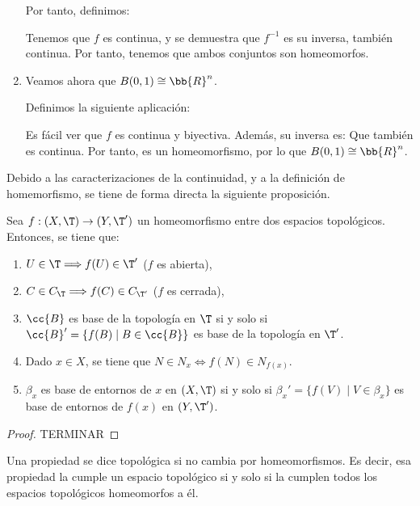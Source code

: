\begin{ejemplo}
\begin{enumerate}
        Por tanto, definimos:

        Tenemos que $f$ es continua, y se demuestra que $f^{-1}$ es su inversa, también continua. Por tanto, tenemos que ambos conjuntos son homeomorfos.

        \item Veamos ahora que $B(0,1)\cong \bb{R}^n$.

        Definimos la siguiente aplicación:

        Es fácil ver que $f$ es continua y biyectiva. Además, su inversa es: 
        Que también es continua. Por tanto, es un homeomorfismo, por lo que $B(0,1)\cong \bb{R}^n$.
    \end{enumerate}
\end{ejemplo}

Debido a las caracterizaciones de la continuidad, y a la definición de homemorfismo, se tiene de forma directa la siguiente proposición.
\begin{prop}
    Sea $f:(X,\T)\to (Y,\T')$ un homeomorfismo entre dos espacios topológicos. Entonces, se tiene que:
    \begin{enumerate}
        \item $U\in \T\Longrightarrow f(U)\in \T'$ \quad ($f$ es abierta),
        \item $C\in C_\T\Longrightarrow f(C)\in C_{\T'}$ \quad ($f$ es cerrada),
        \item $\cc{B}$ es base de la topología en $\T$ si y solo si $\cc{B}'=\{f(B)\mid B\in \cc{B}\}$ es base de la topología en $\T'$.
        \item Dado $x\in X$, se tiene que $N\in N_x \Longleftrightarrow f(N)\in N_{f(x)}$.
        \item $\beta_x$ es base de entornos de $x$ en $(X,\T)$ si y solo si $\beta_x'=\{f(V)\mid V\in \beta_x\}$ es base de entornos de $f(x)$ en $(Y,\T')$.
    \end{enumerate}
\end{prop}
\begin{proof}
    TERMINAR
\end{proof}

\begin{definicion}
    Una propiedad se dice topológica si no cambia por homeomorfismos. Es decir, esa propiedad la cumple un espacio topológico si y solo si la cumplen todos los espacios topológicos homeomorfos a él.
\end{definicion}

